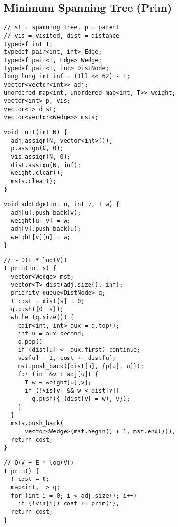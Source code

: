 \documentclass[twoside]{article}
\newcommand{\fileTitleStyle}{\large\underline}
\begin{document}
\begin{multicols*}{2}
\subsection*{Minimum Spanning Tree (Prim)}
\begin{verbatim}
// st = spanning tree, p = parent
// vis = visited, dist = distance
typedef int T;
typedef pair<int, int> Edge;
typedef pair<T, Edge> Wedge;
typedef pair<T, int> DistNode;
long long int inf = (1ll << 62) - 1;
vector<vector<int>> adj;
unordered_map<int, unordered_map<int, T>> weight;
vector<int> p, vis;
vector<T> dist;
vector<vector<Wedge>> msts;
\end{verbatim}
\vspace{-12pt}
\begin{verbatim}
void init(int N) {
  adj.assign(N, vector<int>());
  p.assign(N, 0);
  vis.assign(N, 0);
  dist.assign(N, inf);
  weight.clear();
  msts.clear();
}
\end{verbatim}
\vspace{-12pt}
\begin{verbatim}
void addEdge(int u, int v, T w) {
  adj[u].push_back(v);
  weight[u][v] = w;
  adj[v].push_back(u);
  weight[v][u] = w;
}
\end{verbatim}
\vspace{-12pt}
\begin{verbatim}
// ~ O(E * log(V))
T prim(int s) {
  vector<Wedge> mst;
  vector<T> dist(adj.size(), inf);
  priority_queue<DistNode> q;
  T cost = dist[s] = 0;
  q.push({0, s});
  while (q.size()) {
    pair<int, int> aux = q.top();
    int u = aux.second;
    q.pop();
    if (dist[u] < -aux.first) continue;
    vis[u] = 1, cost += dist[u];
    mst.push_back({dist[u], {p[u], u}});
    for (int &v : adj[u]) {
      T w = weight[u][v];
      if (!vis[v] && w < dist[v])
        q.push({-(dist[v] = w), v});
    }
  }
  msts.push_back(
      vector<Wedge>(mst.begin() + 1, mst.end()));
  return cost;
}
\end{verbatim}
\vspace{-12pt}
\begin{verbatim}
// O(V + E * log(V))
T prim() {
  T cost = 0;
  map<int, T> q;
  for (int i = 0; i < adj.size(); i++)
    if (!vis[i]) cost += prim(i);
  return cost;
}
\end{verbatim}

\subsectionfont{\centering\bfseries\LARGE}
\subsectionfont{\fileTitleStyle}

\end{multicols*}
\end{document}
